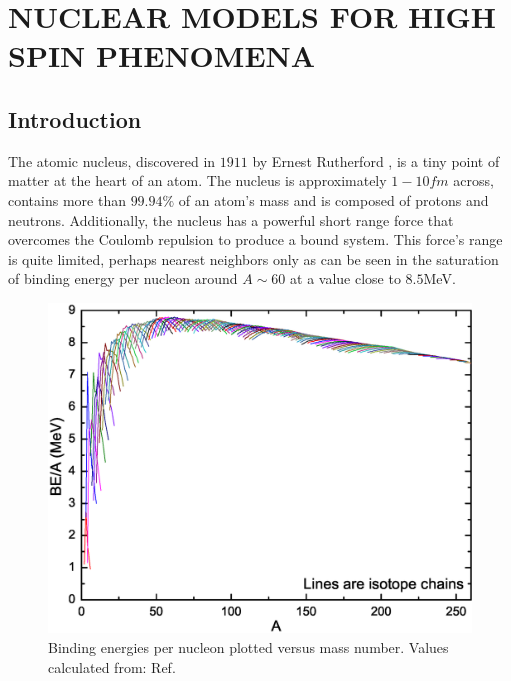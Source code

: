 %
%

\chapter{NUCLEAR MODELS FOR HIGH SPIN PHENOMENA}
\label{chp:models}

\section{Introduction}
\label{sec:models-into}
The atomic nucleus, discovered in $1911$ by Ernest Rutherford \cite{rutherfordNuclearModel}, is a tiny point of matter at the heart of an atom. The nucleus is approximately $1-10fm$ across, contains more than $99.94\%$ of an atom's mass and is composed of protons and neutrons. Additionally, the nucleus has a powerful short range force that overcomes the Coulomb repulsion to produce a bound system. This force's range is quite limited, perhaps nearest neighbors only as can be seen in the saturation of binding energy per nucleon around $A\sim60$ at a value close to $8.5$MeV.

\begin{figure}[h!]
\centerline{\includegraphics[width=\textwidth]{./img/c2/binding_plot.eps}}
	\caption{Binding energies per nucleon plotted versus mass number. Values calculated from: Ref.\cite{AME20031,AME20032}\label{fig:chp2-binding}}
\end{figure}

